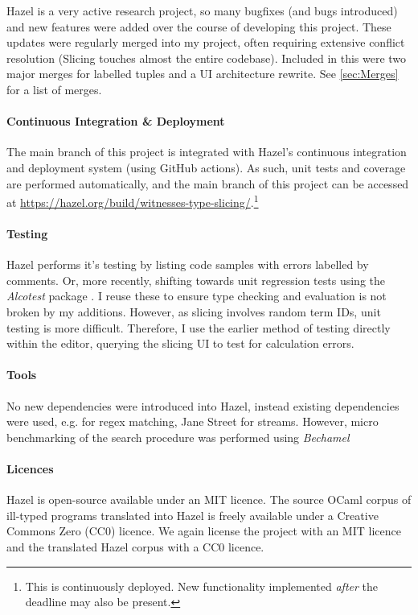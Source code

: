 Hazel is a very active research project, so many bugfixes (and bugs introduced) and new features were added over the course of developing this project. These updates were regularly merged into my project, often requiring extensive conflict resolution (Slicing touches almost the entire codebase). Included in this were two major merges for labelled tuples and a UI architecture rewrite. See \cref{sec:Merges} for a list of merges.
\paragraph{Continuous Integration \& Deployment} The main branch of this project is integrated with Hazel's continuous integration and deployment system (using GitHub actions). As such, unit tests and coverage are performed automatically, and the main branch of this project can be accessed at \url{https://hazel.org/build/witnesses-type-slicing/}.\footnote{This is continuously deployed. New functionality implemented \textit{after} the deadline may also be present.}
\paragraph{Testing} Hazel performs it's testing by listing code samples with errors labelled by comments. Or, more recently, shifting towards unit regression tests using the \textit{Alcotest} package \cite{AlcoTest}. I reuse these to ensure type checking and evaluation is not broken by my additions. However, as slicing involves random term IDs, unit testing is more difficult. Therefore, I use the earlier method of testing directly within the editor, querying the slicing UI to test for calculation errors.
\paragraph{Tools} No new dependencies were introduced into Hazel, instead existing dependencies were used, e.g.  \cite{JSOO} for regex matching, Jane Street  \cite{Base} for streams. However, micro benchmarking of the search procedure was performed using \textit{Bechamel} \cite{Bechamel}

\paragraph{Licences} Hazel is open-source available under an MIT licence. The source OCaml corpus of ill-typed programs \cite{OCamlCorpus} translated into Hazel is freely available under a Creative Commons Zero (CC0) licence. We again license the project with an MIT licence and the translated Hazel corpus with a CC0 licence.
